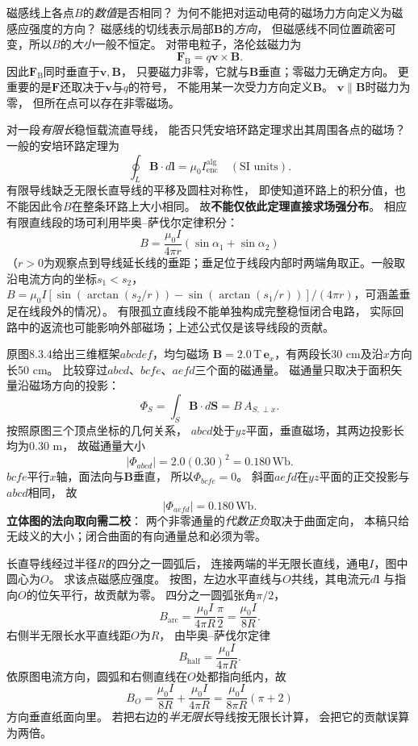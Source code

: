 \problemtext 磁感线上各点$B$的\emph{数值}是否相同？
为何不能把对运动电荷的磁场力方向定义为磁感应强度的方向？
\workings
磁感线的切线表示局部$\bm B$的\emph{方向}，
但磁感线不同位置疏密可变，所以$B$的\emph{大小}一般不恒定。
对带电粒子，洛伦兹磁力为
\[
\boxed{\bm F_{\mathrm B}=q\bm v\times\bm B}.
\]
因此$\bm F_{\mathrm B}$同时垂直于$\bm v,\bm B$，
只要磁力非零，它就与$\bm B$垂直；零磁力无确定方向。
更重要的是$\bm F$还取决于$\bm v$与$q$的符号，
不能用某一次受力方向定义$\bm B$。
\crosscheck $\bm v\parallel\bm B$时磁力为零，
但所在点可以存在非零磁场。

\problemtext 对一段\emph{有限长}稳恒载流直导线，
能否只凭安培环路定理求出其周围各点的磁场？
\workings
一般的安培环路定理为
\[
\oint_L\bm B\cdot d\bm l=\mu_0I_{\mathrm{enc}}^{\mathrm{alg}}
\quad(\text{SI units}).
\]
有限导线缺乏无限长直导线的平移及圆柱对称性，
即使知道环路上的积分值，也不能因此令$B$在整条环路上大小相同。
故\textbf{不能仅依此定理直接求场强分布}。
相应有限直线段的场可利用毕奥--萨伐尔定律积分：
\[
\boxed{B=\frac{\mu_0I}{4\pi r}
(\sin\alpha_1+\sin\alpha_2)}
\]
（$r>0$为观察点到导线延长线的垂距；垂足位于线段内部时两端角取正。一般取沿电流方向的坐标$s_1<s_2$，$B=\mu_0I[\sin(\arctan(s_2/r))-\sin(\arctan(s_1/r))]/(4\pi r)$，可涵盖垂足在线段外的情况）。
\crosscheck 有限孤立直线段不能单独构成完整稳恒闭合电路，
实际回路中的返流也可能影响外部磁场；上述公式仅是该导线段的贡献。

\problemtext 原图8.3.4给出三维框架$abcdef$，均匀磁场
$\bm B=2.0\,\mathrm T\,\bm e_x$，有两段长30 cm及沿$x$方向长50 cm。
比较穿过$abcd$、$bcfe$、$aefd$三个面的磁通量。
\workings
磁通量只取决于面积矢量沿磁场方向的投影：
\[
\boxed{\Phi_S=\int_S\bm B\cdot d\bm S
=B\,A_{S,\perp x}}.
\]
按照原图三个顶点坐标的几何关系，
$abcd$处于$yz$平面，垂直磁场，其两边投影长均为$0.30$ m，
故磁通量大小
\[
\boxed{|\Phi_{abcd}|=2.0(0.30)^2=0.180\,\mathrm{Wb}}.
\]
$bcfe$平行$x$轴，面法向与$\bm B$垂直，
所以$\boxed{\Phi_{bcfe}=0}$。
斜面$aefd$在$yz$平面的正交投影与$abcd$相同，
故
\[
\boxed{|\Phi_{aefd}|=0.180\,\mathrm{Wb}}.
\]
\crosscheck \textbf{立体图的法向取向需二校}：
两个非零通量的\emph{代数正负}取决于曲面定向，
本稿只给无歧义的大小；闭合曲面的有向通量总和必须为零。

\problemtext 长直导线经过半径$R$的四分之一圆弧后，
连接两端的半无限长直线，通电$I$，图中圆心为$O$。
求该点磁感应强度。
\workings
按图，左边水平直线与$O$共线，其电流元$d\bm l$
与指向$O$的位矢平行，故贡献为零。
四分之一圆弧张角$\pi/2$，
\[
B_{\mathrm{arc}}=\frac{\mu_0I}{4\pi R}\frac{\pi}{2}
=\frac{\mu_0I}{8R}.
\]
右侧半无限长水平直线距$O$为$R$，
由毕奥--萨伐尔定律
\[
B_{\mathrm{half}}=\frac{\mu_0I}{4\pi R}.
\]
依原图电流方向，圆弧和右侧直线在$O$处都指向纸内，故
\[
\boxed{B_O=\frac{\mu_0I}{8R}
+\frac{\mu_0I}{4\pi R}
=\frac{\mu_0I}{8\pi R}(\pi+2)}
\]
方向垂直纸面向里。
\crosscheck 若把右边的\emph{半无限长}导线按无限长计算，
会把它的贡献误算为两倍。

